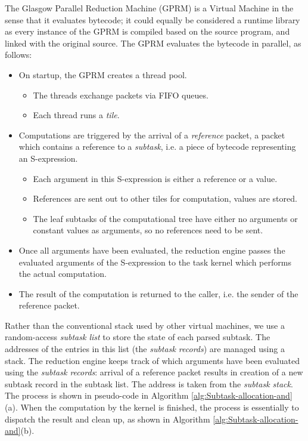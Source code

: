\documentclass[copyright,creativecommons]{eptcs}
\begin{document}
The Glasgow Parallel Reduction Machine (GPRM) is a Virtual Machine
in the sense that it evaluates bytecode; it could equally be considered
a runtime library as every instance of the GPRM is compiled based
on the source program, and linked with the original source. The GPRM
evaluates the bytecode in parallel, as follows: 
\begin{itemize}
\item On startup, the GPRM creates a thread pool. 

\begin{itemize}
\item The threads exchange packets via FIFO queues. 
\item Each thread runs a \emph{tile}.
\end{itemize}
\item Computations are triggered by the arrival of a \emph{reference} packet,
a packet which contains a reference to a \emph{subtask}, i.e. a piece
of bytecode representing an S-expression. 

\begin{itemize}
\item Each argument in this S-expression is either a reference or a value. 
\item References are sent out to other tiles for computation, values are
stored. 
\item The leaf subtasks of the computational tree have either no arguments
or constant values as arguments, so no references need to be sent.
\end{itemize}
\item Once all arguments have been evaluated, the reduction engine passes
the evaluated arguments of the S-expression to the task kernel which
performs the actual computation. 
\item The result of the computation is returned to the caller, i.e. the
sender of the reference packet. 
\end{itemize}
Rather than the conventional stack used by other virtual machines,
we use a random-access \emph{subtask list} to store the state of each
parsed subtask. The addresses of the entries in this list (the \emph{subtask
records}) are managed using a stack. The reduction engine keeps track
of which arguments have been evaluated using the \emph{subtask records}:
arrival of a reference packet results in creation of a new subtask
record in the subtask list. The address is taken from the \emph{subtask
stack}. The process is shown in pseudo-code in Algorithm \ref{alg:Subtask-allocation-and}(a).
When the computation by the kernel is finished, the process is essentially
to dispatch the result and clean up, as shown in Algorithm \ref{alg:Subtask-allocation-and}(b).
\end{document}
